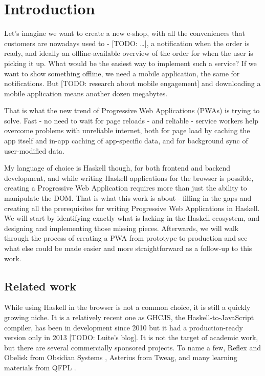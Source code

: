 \documentclass[english,odsaz]{fitthesis}
\date{\today}
\title{}
\begin{document}
\maketitle
\setlength{\parskip}{0pt}
{\hypersetup{hidelinks}\tableofcontents}
\iftotalfigures\listoffigures\fi
\iftotaltables\listoftables\fi
\iftwoside\cleardoublepage\fi
\setlength{\parskip}{0.5\bigskipamount}

\chapter{Introduction}
\label{sec:org976b80d}
Let's imagine we want to create a new e-shop, with all the conveniences that
customers are nowadays used to - [TODO: \ldots{}], a notification when the order is
ready, and ideally an offline-available overview of the order for when the user
is picking it up. What would be the easiest way to implement such a service? If
we want to show something offline, we need a mobile application, the same for
notifications. But [TODO: research about mobile engagement] and downloading a
mobile application means another dozen megabytes.

That is what the new trend of Progressive Web Applications (PWAs) is trying to
solve. Fast - no need to wait for page reloads - and reliable - service workers help
overcome problems with unreliable internet, both for page load by caching the
app itself and in-app caching of app-specific data, and for background sync of
user-modified data.

My language of choice is Haskell though, for both frontend and backend
development, and while writing Haskell applications for the browser is possible,
creating a Progressive Web Application requires more than just the ability to
manipulate the DOM. That is what this work is about - filling in the gaps and
creating all the prerequisites for writing Progressive Web Applications in
Haskell. We will start by identifying exactly what is lacking in the Haskell
ecosystem, and designing and implementing those missing pieces. Afterwards, we
will walk through the process of creating a PWA from prototype to production and
see what else could be made easier and more straightforward as a follow-up to
this work.

\section{Related work}
\label{sec:org6a1b5ec}
While using Haskell in the browser is not a common choice, it is still a quickly
growing niche. It is a relatively recent one as GHCJS, the Haskell-to-JavaScript
compiler, has been in development since 2010 \cite{ghcjs} but it had a
production-ready version only in 2013 [TODO: Luite's blog]. It is not the target of
academic work, but there are several commercially sponsored projects. To name a
few, Reflex and Obelisk from Obsidian Systems \cite{obsidian}, Asterius from Tweag,
and many learning materials from QFPL \cite{qfpl}.
\end{document}
